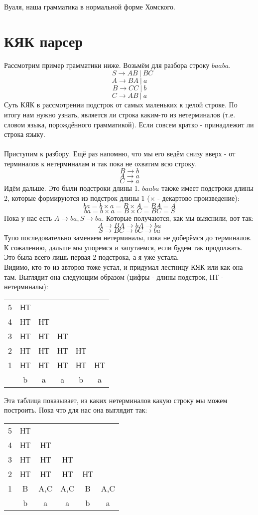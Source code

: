 \documentclass{article}
\begin{document}
Вуаля, наша грамматика в нормальной форме Хомского.

\part{КЯК парсер}
Рассмотрим пример грамматики ниже. Возьмём для разбора строку $baaba$.
$$\ \ \ \ S \to AB \ | \ BC $$
$$A \to BA \ | \ a $$
$$B \to CC \ | \ b $$
$$C \to AB \ | \ a $$
Суть КЯК в рассмотрении подстрок от самых маленьких к целой строке. 
По итогу нам нужно узнать, является ли строка каким-то из нетерминалов 
(т.е. словом языка, порождённого грамматикой). Если совсем кратко -
принадлежит ли строка языку.
\\\\
Приступим к разбору. Ещё раз напомню, что мы его ведём снизу вверх - 
от терминалов к нетерминалам и так пока не охватим всю строку.
$$B \to b$$
$$A \to a$$
$$C \to a$$
Идём дальше. Это были подстроки длины 1. $baaba$ также имеет подстроки длины 2,
которые формируются из подстрок длины 1 ($\times$ - декартово произведение):
$$ba = b\times a = B \times A = BA = A$$
$$ba = b\times a = B \times C = BC = S$$
Пока у нас есть $A \to ba, S \to ba$. 
Которые получаются, как мы выяснили, вот так:
$$ A \to BA \to bA \to ba$$
$$ S \to BC \to bC \to ba$$
Тупо последовательно заменяем нетерминалы, пока не доберёмся до терминалов.
К сожалению, дальше мы упоремся и запутаемся, если будем так продолжать. 
Это была всего лишь первая 2-подстрока, а я уже устала.\\
Видимо, кто-то из авторов тоже устал, и придумал лестницу КЯК или как она там. 
Выглядит она следующим образом (цифры - длины подстрок, НТ - нетерминалы):\\
\begin{center}
    \begin{tabular}{ c|c c c c c }
    5 & НТ \\ 
    4 & НТ & НТ  \\  
    3 & НТ & НТ & НТ   \\  
    2 & НТ & НТ & НТ & НТ  \\  
    1 & НТ & НТ & НТ & НТ & НТ  \\
    \hline
      & b  &  a &  a & b  &  a 
    \end{tabular}
\end{center}
Эта таблица показывает, из каких нетерминалов какую строку мы можем построить.
Пока что для нас она выглядит так:
\begin{center}
    \begin{tabular}{ c|c c c c c }
    5 & НТ  \\ 
    4 & НТ & НТ   \\  
    3 & НТ & НТ & НТ   \\  
    2 & НТ & НТ & НТ & НТ  \\  
    1 & B & A,C & A,C & B & A,C  \\
    \hline
      & b  &  a &  a & b  &  a 
    \end{tabular}
\end{center}
\end{document}
